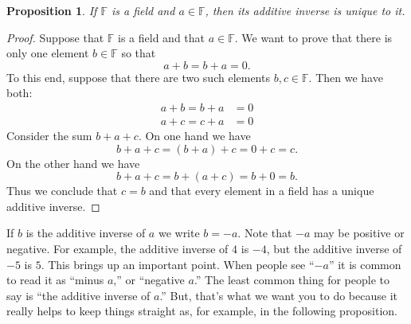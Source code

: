 \documentclass[11pt]{article}
\newtheorem{proposition}[theorem]{Proposition}
\theoremstyle{definition}
\begin{document}
\begin{proposition}
  If $\mathbb{F}$ is a field and $a\in \mathbb{F}$, then its additive inverse is unique to it.
\end{proposition}
\begin{proof}
  Suppose that $\mathbb{F}$ is a field and that $a\in\mathbb{F}$. We want to prove that there is only one element $b\in\mathbb{F}$ so that
  \[ a+b=b+a=0.\]
  To this end, suppose that there are two such elements $b,c\in\mathbb{F}$. Then we have both:
  \begin{align*}
    a + b = b + a &= 0\\
    a + c = c + a &= 0
  \end{align*}
  Consider the sum $b + a + c$. On one hand we have
  \[ b + a + c = (b+a) + c = 0 + c = c.\]
  On the other hand we have
  \[ b + a + c = b+ (a + c) = b + 0 = b.\]
  Thus we conclude that $c=b$ and that every element in a field has a unique additive inverse.
\end{proof}

If $b$ is the additive inverse of $a$ we write $b = -a$. Note that $-a$ may be positive or negative. For example,
the additive inverse of $4$ is $-4$, but the additive inverse of $-5$ is $5$. This brings up an important point. 
When people see ``$-a$'' it is common to read it as ``minus $a$,'' or ``negative $a$.'' The least common thing for
people to say is ``the additive inverse of $a$.'' But, that's what we want you to do because it really helps to 
keep things straight as, for example, in the following proposition.
\end{document}
